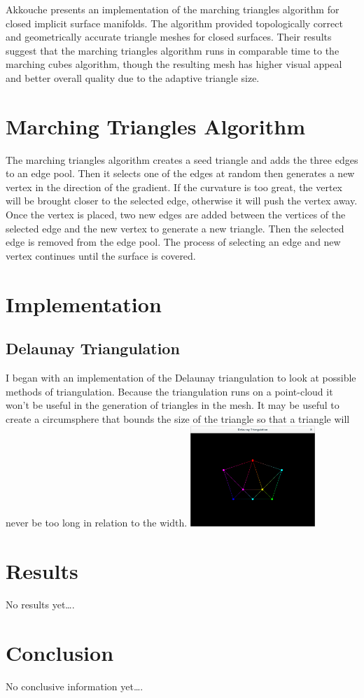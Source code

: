 \documentclass[conference]{acmsiggraph}
\begin{document}
Akkouche presents an implementation of the marching triangles algorithm for
closed implicit surface manifolds\cite{Akkouche2001}. The algorithm provided
topologically correct and geometrically accurate triangle meshes for closed
surfaces. Their results suggest that the marching triangles algorithm runs in
comparable time to the marching cubes algorithm, though the resulting mesh has
higher visual appeal and better overall quality due to the adaptive triangle
size.

\section{Marching Triangles Algorithm}
The marching triangles algorithm creates a seed triangle and adds the three
edges to an edge pool. Then it selects one of the edges at random then
generates a new vertex in the direction of the gradient. If the curvature is
too great, the vertex will be brought closer to the selected edge, otherwise it
will push the vertex away. Once the vertex is placed, two new edges are added
between the vertices of the selected edge and the new vertex to generate a new
triangle. Then the selected edge is removed from the edge pool. The process of
selecting an edge and new vertex continues until the surface is covered.

\section {Implementation}

\subsection{Delaunay Triangulation}
I began with an implementation of the Delaunay triangulation to look at
possible methods of triangulation. Because the triangulation runs on a
point-cloud it won't be useful in the generation of triangles in the mesh. It
may be useful to create a circumsphere that bounds the size of the triangle so
that a triangle will never be too long in relation to the width.
\includegraphics[height=1.5in]{images/Triangulated.png}

\section{Results}
No results yet\ldots.


\section{Conclusion}
No conclusive information yet\ldots.




\end{document}
